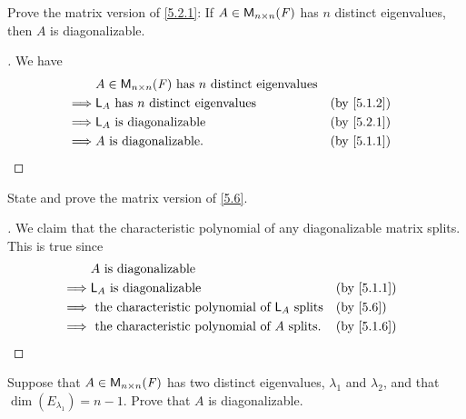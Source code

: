 \exercisesection

\setcounter{ex}{3}
\begin{ex}\label{ex:5.2.4}
	Prove the matrix version of \cref{5.2.1}:
	If \(A \in \ms[n][n][\F]\) has \(n\) distinct eigenvalues, then \(A\) is diagonalizable.
\end{ex}

\begin{proof}[]
	We have
	\begin{align*}
		         & A \in \ms[n][n][\F] \text{ has } n \text{ distinct  eigenvalues}                 \\
		\implies & \L_A \text{ has } n \text{ distinct  eigenvalues}                &  & \by{5.1.2} \\
		\implies & \L_A \text{ is diagonalizable}                                   &  & \by{5.2.1} \\
		\implies & A \text{ is diagonalizable}.                                     &  & \by{5.1.1}
	\end{align*}
\end{proof}

\begin{ex}\label{ex:5.2.5}
	State and prove the matrix version of \cref{5.6}.
\end{ex}

\begin{proof}[]
	We claim that the characteristic polynomial of any diagonalizable matrix splits.
	This is true since
	\begin{align*}
		         & A \text{ is diagonalizable}                                                   \\
		\implies & \L_A \text{ is diagonalizable}                                &  & \by{5.1.1} \\
		\implies & \text{ the characteristic polynomial of } \L_A \text{ splits} &  & \by{5.6}   \\
		\implies & \text{ the characteristic polynomial of } A \text{ splits}.   &  & \by{5.1.6}
	\end{align*}
\end{proof}

\setcounter{ex}{7}
\begin{ex}\label{ex:5.2.8}
	Suppose that \(A \in \ms[n][n][\F]\) has two distinct eigenvalues, \(\lambda_1\) and \(\lambda_2\), and that \(\dim(E_{\lambda_1}) = n - 1\).
	Prove that \(A\) is diagonalizable.
\end{ex}

